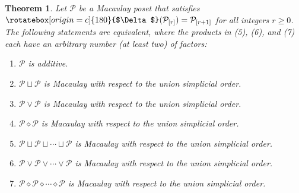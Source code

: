 \documentclass[11pt, reqno]{amsart}
\renewcommand{\P}{{\mathcal P}}
\newcommand{\uSdw}{\rotatebox[origin=c]{180}{$\Delta$}}
\newcommand{\di}{\diamond}
\theoremstyle{plain} %
\newtheorem{thm}{Theorem}[section]
\theoremstyle{definition}
\theoremstyle{remark}
\numberwithin{equation}{section}  %
\begin{document}
\begin{thm}\label{thm: equiv union wedge diamond}
Let $\P$ be a Macaulay poset that satisfies $\uSdw(\P_{[r]})=\P_{[r+1]}$ for all integers $r\geq 0$. The following statements are equivalent, where the products in (5), (6), and (7) each have an arbitrary number (at least two) of factors:
\begin{enumerate}
\item $\P$ is additive.
\item $\P\sqcup \P$ is Macaulay with respect to the union simplicial order. %
\item $\P\vee \P$ is Macaulay with respect to the union simplicial order.%
\item $\P\di \P$ is Macaulay with respect to the union simplicial order. %

\item[(5)] $\P\sqcup \P \sqcup \cdots \sqcup \P$ is Macaulay with respect to the union simplicial order. %
\item[(6)] $\P\vee \P \vee \cdots \vee \P$ is Macaulay with respect to the union simplicial order. %
\item[(7)] $\P\di \P \di \cdots \di \P$ is Macaulay with respect to the union simplicial order. %
\end{enumerate}
\end{thm}
\end{document}
